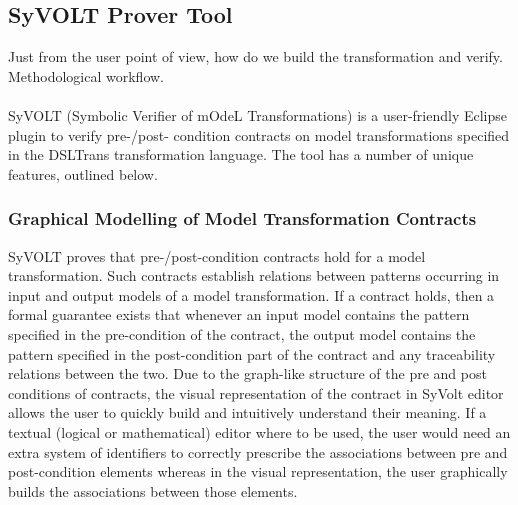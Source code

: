 \subsection{SyVOLT Prover Tool}

Just from the user point of view, how do we build the transformation and
verify. Methodological workflow.\\\\

SyVOLT (Symbolic Verifier of mOdeL Transformations) is a user-friendly Eclipse plugin to verify pre-/post- condition contracts
on model transformations specified in the DSLTrans transformation language. The
tool has a number of unique features, outlined below.

\subsubsection{Graphical Modelling of Model Transformation Contracts}

 SyVOLT
proves that pre-/post-condition contracts hold for a model transformation. Such
contracts establish relations between patterns occurring in input and output
models of a model transformation. If a contract holds, then a formal guarantee
exists that whenever an input model contains the pattern specified in the
pre-condition of the contract, the output model contains the pattern specified
in the post-condition part of the contract and any traceability relations
between the two.
Due to the graph-like structure of the pre and post conditions of contracts, the
visual representation of the contract in SyVolt editor allows the user to
quickly build and intuitively understand their meaning.
If a textual (logical or mathematical) editor where to be used, the user would
need an extra system of identifiers to correctly prescribe the associations
between pre and post-condition elements whereas in the visual representation,
the user graphically builds the associations between those elements.

